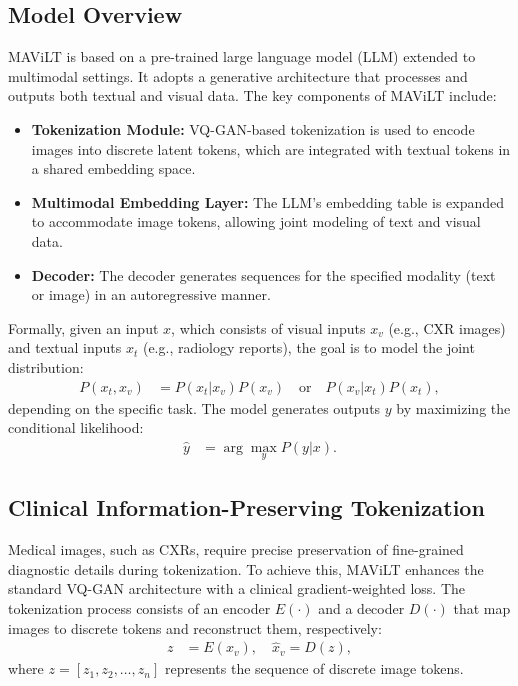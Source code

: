 \subsection{Model Overview}

MAViLT is based on a pre-trained large language model (LLM) extended to multimodal settings. It adopts a generative architecture that processes and outputs both textual and visual data. The key components of MAViLT include:
\begin{itemize}
    \item \textbf{Tokenization Module:} VQ-GAN-based tokenization is used to encode images into discrete latent tokens, which are integrated with textual tokens in a shared embedding space.
    \item \textbf{Multimodal Embedding Layer:} The LLM's embedding table is expanded to accommodate image tokens, allowing joint modeling of text and visual data.
    \item \textbf{Decoder:} The decoder generates sequences for the specified modality (text or image) in an autoregressive manner.
\end{itemize}

Formally, given an input \( x \), which consists of visual inputs \( x_v \) (e.g., CXR images) and textual inputs \( x_t \) (e.g., radiology reports), the goal is to model the joint distribution:
\begin{align}
    P(x_t, x_v) &= P(x_t | x_v) P(x_v) \quad \text{or} \quad P(x_v | x_t) P(x_t),
\end{align}
depending on the specific task. The model generates outputs \( y \) by maximizing the conditional likelihood:
\begin{align}
    \hat{y} &= \arg \max_y P(y | x).
\end{align}

\subsection{Clinical Information-Preserving Tokenization}

Medical images, such as CXRs, require precise preservation of fine-grained diagnostic details during tokenization. To achieve this, MAViLT enhances the standard VQ-GAN architecture with a clinical gradient-weighted loss. The tokenization process consists of an encoder \( E(\cdot) \) and a decoder \( D(\cdot) \) that map images to discrete tokens and reconstruct them, respectively:
\begin{align}
    z &= E(x_v), \quad \hat{x}_v = D(z),
\end{align}
where \( z = [z_1, z_2, \dots, z_n] \) represents the sequence of discrete image tokens.

